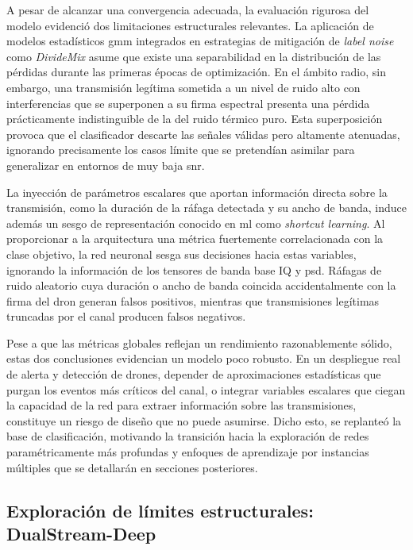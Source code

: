 A pesar de alcanzar una convergencia adecuada, la evaluación rigurosa del modelo evidenció dos limitaciones estructurales relevantes. La aplicación de modelos estadísticos \gls{gmm} integrados en estrategias de mitigación de \textit{label noise} como \textit{DivideMix} asume que existe una separabilidad en la distribución de las pérdidas durante las primeras épocas de optimización. En el ámbito radio, sin embargo, una transmisión legítima sometida a un nivel de ruido alto con interferencias que se superponen a su firma espectral presenta una pérdida prácticamente indistinguible de la del ruido térmico puro. Esta superposición provoca que el clasificador descarte las señales válidas pero altamente atenuadas, ignorando precisamente los casos límite que se pretendían asimilar para generalizar en entornos de muy baja \gls{snr}.

La inyección de parámetros escalares que aportan información directa sobre la transmisión, como la duración de la ráfaga detectada y su ancho de banda, induce además un sesgo de representación conocido en \gls{ml} como \textit{shortcut learning}. Al proporcionar a la arquitectura una métrica fuertemente correlacionada con la clase objetivo, la red neuronal sesga sus decisiones hacia estas variables, ignorando la información de los tensores de banda base IQ y \gls{psd}. Ráfagas de ruido aleatorio cuya duración o ancho de banda coincida accidentalmente con la firma del dron generan falsos positivos, mientras que transmisiones legítimas truncadas por el canal producen falsos negativos.

Pese a que las métricas globales reflejan un rendimiento razonablemente sólido, estas dos conclusiones evidencian un modelo poco robusto. En un despliegue real de alerta y detección de drones, depender de aproximaciones estadísticas que purgan los eventos más críticos del canal, o integrar variables escalares que ciegan la capacidad de la red para extraer información sobre las transmisiones, constituye un riesgo de diseño que no puede asumirse. Dicho esto, se replanteó la base de clasificación, motivando la transición hacia la exploración de redes paramétricamente más profundas y enfoques de aprendizaje por instancias múltiples que se detallarán en secciones posteriores.

\subsection{Exploración de límites estructurales: DualStream-Deep }
\label{subsec:dualstream_deep}

